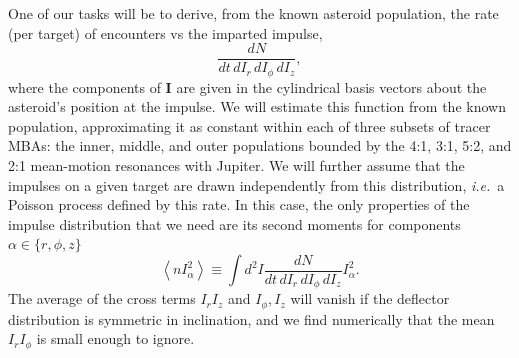 \documentclass[linenumbers, onecolumn]{aastex631}
\newcommand{\ie}{\textit{i.e.\/}}
\newcommand{\vecI}{\mathbf{I}}
\begin{document}
One of our tasks will be to derive, from the known asteroid population, the rate (per target) of encounters vs the imparted impulse,
\begin{equation}
  \frac{dN}{dt\,dI_r\,dI_\phi\,dI_z},
  \label{eq:dN}
\end{equation}
where the components of $\vecI$ are given in the cylindrical basis
vectors about the asteroid's position at the impulse.
We will estimate this function from the known population,
approximating it as constant within each of three subsets of tracer MBAs:
the inner, middle, and outer populations bounded by the 4:1, 3:1,
5:2, and 2:1 mean-motion resonances with Jupiter.
We will further assume that the impulses on a given target are drawn
independently from this distribution, \ie\ a Poisson process defined
by this rate.  In this case, the only properties of the impulse
distribution that we need are its second moments for components $\alpha \in \{r,\phi,z\}$
\begin{equation}
  \left \langle n I_\alpha^2 \right\rangle \equiv \int d^2I \frac{dN}{dt\,dI_r\,dI_\phi\,dI_z} I_\alpha^2.
\label{eq:nvsq}
\end{equation}
The average of the cross terms $I_rI_z$ and $I_\phi, I_z$ will vanish if the deflector distribution is symmetric in inclination, and we find numerically that the mean $I_rI_\phi$ is small enough to ignore.
\end{document}

